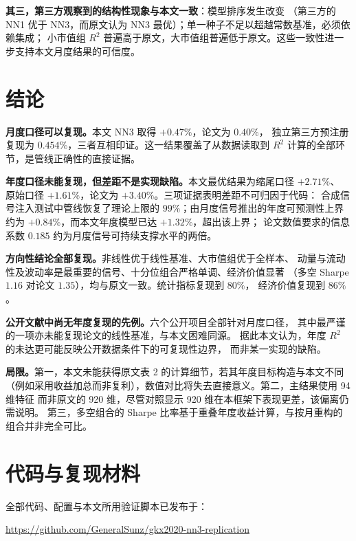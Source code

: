 \documentclass[11pt,a4paper,fontset=windows]{ctexart}
\newcommand{\repourl}{https://github.com/GeneralSunz/gkx2020-nn3-replication}
\begin{document}
\textbf{其三，第三方观察到的结构性现象与本文一致}：模型排序发生改变
（第三方的 NN1 优于 NN3，而原文认为 NN3 最优）；单一种子不足以超越常数基准，必须依赖集成；
小市值组 $R^2$ 普遍高于原文，大市值组普遍低于原文。这些一致性进一步支持本文月度结果的可信度。

\section{结论}\label{sec:conclusion}

\textbf{月度口径可以复现。}本文 NN3 取得 $+0.47\%$，论文为 $0.40\%$，
独立第三方预注册复现为 $0.454\%$，三者互相印证。这一结果覆盖了从数据读取到
$R^2$ 计算的全部环节，是管线正确性的直接证据。

\textbf{年度口径未能复现，但差距不是实现缺陷。}本文最优结果为缩尾口径 $+2.71\%$、
原始口径 $+1.61\%$，论文为 $+3.40\%$。三项证据表明差距不可归因于代码：
合成信号注入测试中管线恢复了理论上限的 $99\%$；由月度信号推出的年度可预测性上界约为
$+0.84\%$，而本文年度模型已达 $+1.32\%$，超出该上界；
论文数值要求的信息系数 $0.185$ 约为月度信号可持续支撑水平的两倍。

\textbf{方向性结论全部复现。}非线性优于线性基准、大市值组优于全样本、
动量与流动性及波动率是最重要的信号、十分位组合严格单调、经济价值显著
（多空 Sharpe $1.16$ 对论文 $1.35$），均与原文一致。统计指标复现到 $80\%$，
经济价值复现到 $86\%$。

\textbf{公开文献中尚无年度复现的先例。}六个公开项目全部针对月度口径，
其中最严谨的一项亦未能复现论文的线性基准，与本文困难同源。
据此本文认为，年度 $R^2$ 的未达更可能反映公开数据条件下的可复现性边界，
而非某一实现的缺陷。

\textbf{局限。}第一，本文未能获得原文表 2 的计算细节，若其年度目标构造与本文不同
（例如采用收益加总而非复利），数值对比将失去直接意义。第二，主结果使用 94 维特征
而非原文的 920 维，尽管对照显示 920 维在本框架下表现更差，该偏离仍需说明。
第三，多空组合的 Sharpe 比率基于重叠年度收益计算，与按月重构的组合并非完全可比。

\appendix

\section{代码与复现材料}\label{app:code}

全部代码、配置与本文所用验证脚本已发布于：

\begin{center}
\url{\repourl}
\end{center}
\end{document}
